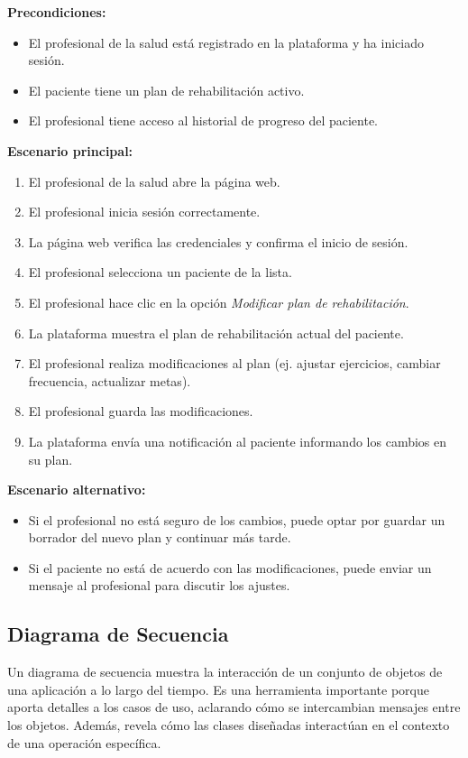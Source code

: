 \documentclass{article}
\begin{document}
\textbf{Precondiciones:}
\begin{itemize}
	\item El profesional de la salud está registrado en la plataforma y ha iniciado sesión.
	\item El paciente tiene un plan de rehabilitación activo.
	\item El profesional tiene acceso al historial de progreso del paciente.
\end{itemize}

\textbf{Escenario principal:}
\begin{enumerate}
	\item El profesional de la salud abre la página web.
	\item El profesional inicia sesión correctamente.
	\item La página web verifica las credenciales y confirma el inicio de sesión.
	\item El profesional selecciona un paciente de la lista.
	\item El profesional hace clic en la opción \textit{Modificar plan de rehabilitación}.
	\item La plataforma muestra el plan de rehabilitación actual del paciente.
	\item El profesional realiza modificaciones al plan (ej. ajustar ejercicios, cambiar frecuencia, actualizar metas).
	\item El profesional guarda las modificaciones.
	\item La plataforma envía una notificación al paciente informando los cambios en su plan.
\end{enumerate}

\textbf{Escenario alternativo:}
\begin{itemize}
	\item Si el profesional no está seguro de los cambios, puede optar por guardar un borrador del nuevo plan y continuar más tarde.
	\item Si el paciente no está de acuerdo con las modificaciones, puede enviar un mensaje al profesional para discutir los ajustes.
\end{itemize}


\subsection{Diagrama de Secuencia}

Un diagrama de secuencia muestra la interacción de un conjunto de objetos de una aplicación a lo largo del tiempo. Es una herramienta importante porque aporta detalles a los casos de uso, aclarando cómo se intercambian mensajes entre los objetos. Además, revela cómo las clases diseñadas interactúan en el contexto de una operación específica.
\end{document}
